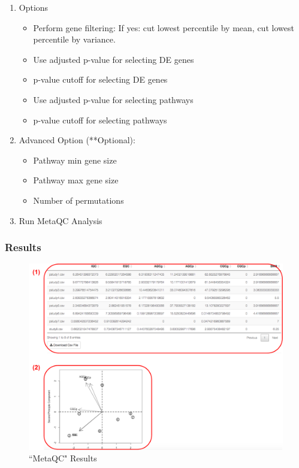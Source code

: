 \begin{enumerate}
  \item Options
  \begin{itemize}
     \item Perform gene filtering: If yes: cut lowest percentile by mean, cut lowest percentile by variance. 
     \item Use adjusted p-value for selecting DE genes
     \item p-value cutoff for selecting DE genes
     \item Use adjusted p-value for selecting pathways
     \item p-value cutoff for selecting pathways
    \end{itemize}
   \item Advanced Option (**Optional): 
        \begin{itemize}
      \item Pathway min gene size
      \item Pathway max gene size
      \item Number of permutations
    \end{itemize} 
  \item Run MetaQC Analysis
\end{enumerate}
   

\subsubsection{Results}


\begin{figure}[H]
\begin{center}
\includegraphics[scale=0.4]{./figure/metaQC/metaQCresult.pdf}
\caption{``MetaQC" Results}
\label{fig:MetaQCresult}
\end{center}
\end{figure}

